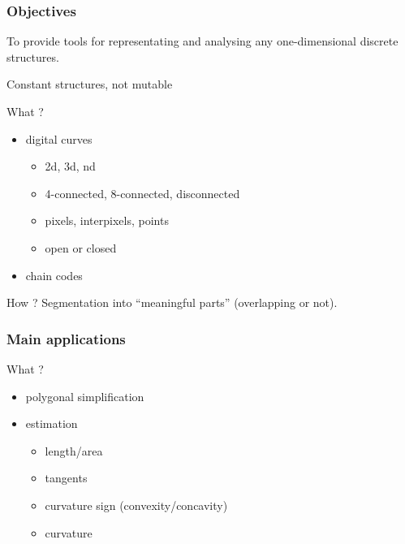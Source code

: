 \begin{frame}
\frametitle{Objectives}

To provide tools for representating and analysing any one-dimensional discrete structures.

\alert{Constant structures, not mutable} 

  \begin{block}{What ?}
    \begin{itemize}
    \item digital curves
      \begin{itemize}
      \item 2d, 3d, nd
      \item 4-connected, 8-connected, disconnected
      \item pixels, interpixels, points
      \item open or closed
      \end{itemize}
		\item chain codes
    \end{itemize}
  \end{block}

  \begin{block}{How ?}
    Segmentation into ``meaningful parts'' (overlapping or not).
  \end{block}


\end{frame}

\begin{frame}
\frametitle{Main applications}

  \begin{block}{What ?}
    \begin{itemize}
    \item<1> polygonal simplification
    \item<1-> estimation 
      \begin{itemize}
      \item<1> length/area
      \item<2> tangents
      \item<3> curvature sign (convexity/concavity)
      \item<4> curvature
      \end{itemize}
    \end{itemize}
  \end{block}


\end{frame}

